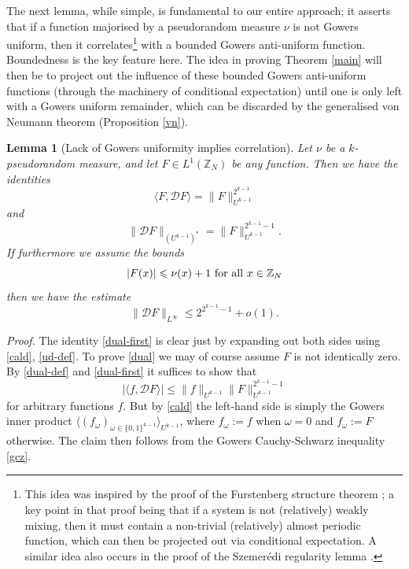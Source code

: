 \documentclass[12pt,a4paper,reqno]{amsart}
\numberwithin{equation}{section}
\theoremstyle{plain}
\newtheorem{lemma}[subsection]{Lemma}
\theoremstyle{definition}
\renewcommand{\leq}{\leqslant}
\def\Z{{\mathbb Z}}
\def\vs{\vspace{11pt}}
\def\ni{\noindent}
\def\proof{\noindent\textit{Proof. }}
\begin{document}
\ni The next lemma, while simple, is fundamental to our entire approach;
it asserts that if a function majorised by a pseudorandom measure $\nu$ is not Gowers uniform, then it correlates\footnote{This idea was inspired by the proof of the Furstenberg structure theorem \cite{furst,FKO}; a key point in that proof being that 
if a system is not (relatively) weakly mixing, then it must contain a non-trivial (relatively) almost periodic function, which can then be projected out via conditional expectation.  A similar idea also occurs in the proof of the Szemer\'edi regularity lemma \cite{szemeredi}.} with a bounded Gowers anti-uniform function. Boundedness is the key feature here. The idea in proving Theorem \ref{main} will then be to project out the influence of these bounded Gowers anti-uniform functions (through the machinery of conditional expectation) until one is only left with a Gowers uniform remainder, which can be discarded by the generalised von Neumann theorem (Proposition \ref{vn}). 

\begin{lemma}[Lack of Gowers uniformity implies correlation]\label{antiuniform}  Let $\nu$ be a $k$-pseudorandom measure, and let $F \in L^1(\Z_N)$ be any function.  Then we have the identities
\begin{equation}\label{dual-first}
 \langle F, {\mathcal D} F \rangle = \| F \|_{U^{k-1}}^{2^{k-1}}
\end{equation}
and
\begin{equation}\label{dual}
 \| {\mathcal D} F \|_{(U^{k-1})^*} = \| F \|_{U^{k-1}}^{2^{k-1}-1}.
\end{equation}
If furthermore we assume the bounds
\[ |F(x)| \leq \nu(x) + 1 \hbox{ for all } x \in \mathbb{Z}_N\]
then we have the estimate
\begin{equation}\label{dual-bounded}
 \| {\mathcal D} F \|_{L^\infty} \leq 2^{2^{k-1}-1} + o(1).
\end{equation}
\end{lemma}

\proof
The identity \eqref{dual-first} is clear just by expanding out both sides using \eqref{cald}, \eqref{ud-def}.  
To prove \eqref{dual} we may of course assume $F$ is not identically zero.  By
\eqref{dual-def} and \eqref{dual-first} it suffices to show that
$$ |\langle f, {\mathcal D} F \rangle| \leq \|f\|_{U^{k-1}} \| F \|_{U^{k-1}}^{2^{k-1}-1}$$
for arbitrary functions $f$.  But by \eqref{cald} the left-hand side is simply the Gowers inner product
$\langle (f_\omega)_{\omega \in \{0,1\}^{k-1}} \rangle_{U^{k-1}}$, where $f_\omega := f$ when $\omega = 0$
and $f_\omega := F$ otherwise.  The claim then follows from the Gowers Cauchy-Schwarz inequality \eqref{gcz}.\vs
\end{document}
